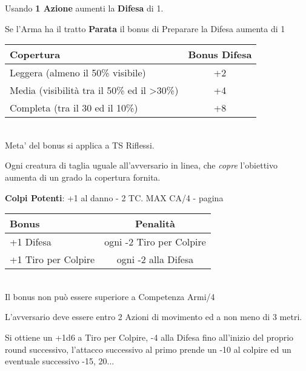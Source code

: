 \documentclass[landscape,10pt,a4paper]{article}
\begin{document}
\begin{multicols}{3}
\begin{dmbox}[title=Preparare la Difesa - pagina \pageref{preparareladifesa}]
Usando \textbf{1 Azione} aumenti la \textbf{Difesa} di 1.

Se l'Arma ha il tratto \textbf{Parata} il bonus di Preparare la Difesa aumenta di 1
\end{dmbox}

\begin{dmbox}[title=Copertura - pagina \pageref{copertura}]
\noindent\begin{tabular}{l|c}
\textbf{Copertura} & \textbf{Bonus Difesa}\\
\hline
Leggera (almeno il 50\% visibile) & +2\\
Media (visibilità tra il 50\% ed il >30\%) & +4 \\
Completa (tra il 30 ed il 10\%) & +8 \\
\end{tabular}\\

Meta' del bonus si applica a TS Riflessi.

Ogni creatura di taglia uguale all'avversario in linea, che \emph{copre} l'obiettivo aumenta di un grado la copertura fornita.

\end{dmbox}

\begin{mybluebox}\textbf{Colpi Potenti}: +1 al danno - 2 TC. MAX CA/4 - pagina \pageref{colpipotenti}\end{mybluebox}


\begin{dmbox}[title=Maestria del combattimento - pagina \pageref{maestriacombattimento}]
\noindent\begin{tabular}{l|c}
\textbf{Bonus} & \textbf{Penalità}\\
\hline
+1 Difesa & ogni -2 Tiro per Colpire\\
+1 Tiro per Colpire & ogni -2 alla Difesa
\end{tabular}\\

Il bonus non può essere superiore a Competenza Armi/4
\end{dmbox}

\begin{dmbox}[title=Carica - pagina \pageref{carica}]

L'avversario deve essere entro 2 Azioni di movimento ed a non meno di 3 metri. 

Si ottiene un +1d6 a Tiro per Colpire, -4 alla Difesa fino all'inizio del proprio round successivo, l'attacco successivo al primo prende un -10 al colpire ed un eventuale successivo -15, 20...


\end{dmbox}
\end{multicols}
\end{document}
